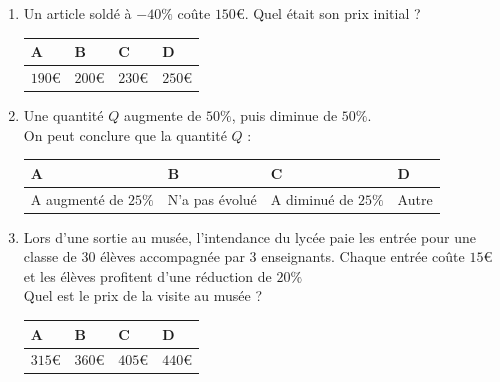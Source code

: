 \documentclass[oneside,12pt]{exam}          %
\begin{document}
\begin{enumerate}[resume*]

		

	\item Un article soldé à $-40\%$ coûte $150$\euro. Quel était son prix initial ?
	
		\hspace{\linewidth-\textwidth}
		\renewcommand{\arraystretch}{1.5}
		\begin{tabular}{| P{0.22\textwidth} | P{0.22\textwidth} | P{0.22\textwidth} | P{0.22\textwidth} |} \hline
			A & B & C & D \\ \hline
			$190$\euro & $200$\euro & $230$\euro & $250$\euro \\ \hline
		\end{tabular}
		
		

	\item Une quantité $Q$ augmente de $50\%$, puis diminue de $50\%$. \\
	On peut conclure que la quantité $Q$ :
	
		\hspace{\linewidth-\textwidth}
		\renewcommand{\arraystretch}{1.5}
		\begin{tabular}{| P{0.22\textwidth} | P{0.22\textwidth} | P{0.22\textwidth} | P{0.22\textwidth} |} \hline
			A & B & C & D \\ \hline
			A augmenté de $25\%$ & N'a pas évolué & A diminué de $25\%$ & Autre \\ \hline
		\end{tabular}	



	\item Lors d'une sortie au musée, l'intendance du lycée paie les entrée pour une classe de 30 élèves accompagnée par 3 enseignants. Chaque entrée coûte $15$\euro\, et les élèves profitent d'une réduction de $20\%$ \\
	Quel est le prix de la visite au musée ?
	
		\hspace{\linewidth-\textwidth}
		\renewcommand{\arraystretch}{1.5}
		\begin{tabular}{| P{0.22\textwidth} | P{0.22\textwidth} | P{0.22\textwidth} | P{0.22\textwidth} |} \hline
			A & B & C & D \\ \hline
			$315$\euro & $360$\euro & $405$\euro & $440$\euro \\ \hline
		\end{tabular}




\end{enumerate}
\end{document}
